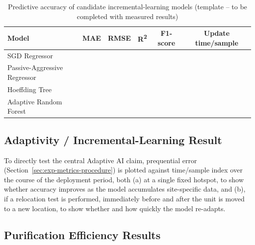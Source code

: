 \begin{table}[htbp]
\centering
\caption{Predictive accuracy of candidate incremental-learning models (template -- to be completed with measured results)}
\label{tab:exp-model-comparison}
\begin{tabular}{@{}lccccc@{}}
\toprule
\textbf{Model} & \textbf{MAE} & \textbf{RMSE} & \textbf{R\textsuperscript{2}} & \textbf{F1-score} & \textbf{Update time/sample} \\
\midrule
SGD Regressor & \TODO{} & \TODO{} & \TODO{} & \TODO{} & \TODO{} \\
Passive-Aggressive Regressor & \TODO{} & \TODO{} & \TODO{} & \TODO{} & \TODO{} \\
Hoeffding Tree & \TODO{} & \TODO{} & \TODO{} & \TODO{} & \TODO{} \\
Adaptive Random Forest & \TODO{} & \TODO{} & \TODO{} & \TODO{} & \TODO{} \\
\bottomrule
\end{tabular}
\end{table}

\subsection{Adaptivity / Incremental-Learning Result}
\label{sec:exp-adaptivity-result}
To directly test the central Adaptive AI claim, prequential error (Section~\ref{sec:exp-metrics-procedure}) is plotted against time/sample index over the course of the deployment period, both (a) at a single fixed hotspot, to show whether accuracy improves as the model accumulates site-specific data, and (b), if a relocation test is performed, immediately before and after the unit is moved to a new location, to show whether and how quickly the model re-adapts. 


\subsection{Purification Efficiency Results}
\label{sec:exp-purification-result}

